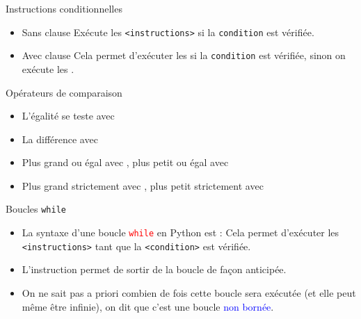 \documentclass[10pt]{beamer}
\begin{document}
\begin{frame}[fragile]{\Ctitle}{\stitle}
	\begin{alertblock}{Instructions conditionnelles}
		\begin{itemize}
			\item<1-> Sans clause 
				Exécute les {\tt <instructions>} si la {\tt condition} est vérifiée.
			\item<2-> Avec clause 
				Cela permet d'exécuter les {\tt <instructions1>} si la {\tt condition} est vérifiée, sinon on exécute les {\tt <instructions2>}.
		\end{itemize}
	\end{alertblock}
\end{frame}

\begin{frame}{\Ctitle}{\stitle}
	\begin{alertblock}{Opérateurs de comparaison}
		\begin{itemize}
			\item<1-> L'égalité se teste avec \kw{==}
			\item<2-> La différence avec \kw{!=}
			\item<3-> Plus grand ou égal avec \kw{>=}, plus petit ou égal avec \kw{<=}
			\item<4-> Plus grand strictement avec \kw{>}, plus petit strictement avec \kw{<}
		\end{itemize}
	\end{alertblock}
\end{frame}

\begin{frame}[fragile]{\Ctitle}{\stitle}
	\begin{alertblock}{Boucles {\tt while}}
		\begin{itemize}
			\item<2-> La syntaxe d'une boucle \textcolor{red}{\tt while}  en Python est :
				Cela permet d'exécuter les {\tt <instructions>} tant que la {\tt <condition>} est  vérifiée.
			\item<3-> L'instruction  permet de sortir de la boucle de façon anticipée.
			\item<4->  On ne sait pas a priori combien de fois cette boucle sera exécutée (et elle peut même être infinie), on dit que c'est une boucle \textcolor{blue}{non bornée}.
		\end{itemize}
	\end{alertblock}
\end{frame}
\end{document}

